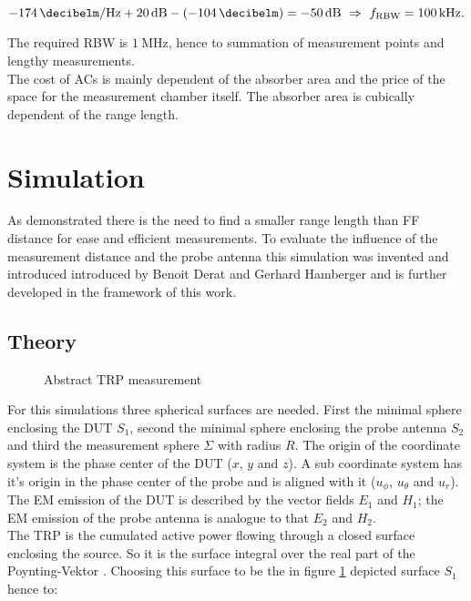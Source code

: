 \begin{equation}
\SI{-174}{\decibelm\per\hertz}+\SI{20}{\decibel}-\left(\SI{-104}{\decibelm}\right)=\SI{-50}{\decibel}\ \Rightarrow\ f_{\text{RBW}}=\SI{100}{\kilo\hertz}.
\end{equation}

The required \ac{RBW} is $\SI{1}{\mega\hertz}$, hence to summation of measurement points and lengthy measurements.\\
The cost of \acp{AC} is mainly dependent of the absorber area and the price of the space for the measurement chamber itself. The absorber area is cubically dependent of the range length.

\section{Simulation}

As demonstrated there is the need to find a smaller range length than \ac{FF} distance for ease and efficient measurements. To evaluate the influence of the measurement distance and the probe antenna this simulation was invented and introduced introduced by Benoit Derat and Gerhard Hamberger \cite{mypaper} and is further developed in the framework of this work.

\subsection{Theory}

\begin{figure}[h]
\centering
\def\svgwidth{0.5\textwidth}

\caption{Abstract TRP measurement}
\label{fig:trpmeas}
\end{figure}

For this simulations three spherical surfaces are needed. First the minimal sphere enclosing the \ac{DUT} $S_1$, second the minimal sphere enclosing the probe antenna $S_2$ and third the measurement sphere $\Sigma$ with radius $R$. The origin of the coordinate system is the phase center of the \ac{DUT} ($x$, $y$ and $z$). A sub coordinate system has it's origin in the phase center of the probe and is aligned with it ($u_\phi$, $u_\theta$ and $u_r$). The \ac{EM} emission of the \ac{DUT} is described by the vector fields $E_1$ and $H_1$; the \ac{EM} emission of the probe antenna is analogue to that $E_2$ and $H_2$.\\
The \ac{TRP} is the cumulated active power flowing through a closed surface enclosing the source. So it is the surface integral over the real part of the Poynting-Vektor \cite{mypaper}. Choosing this surface to be the in figure \ref{fig:trpmeas} depicted surface $S_1$ hence to:


